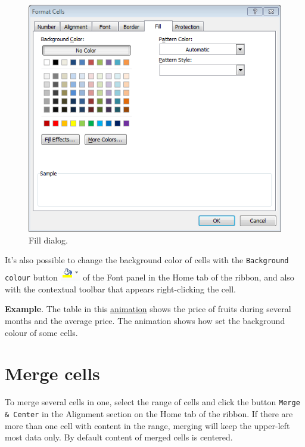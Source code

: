 \begin{figure}[htbp]
\begin{center}
\includegraphics[scale=0.7]{../img/fill_dialog.png}
\end{center}
\caption{Fill dialog.}
\label{img-fill_dialog}
\end{figure}

It's also possible to change the background color of cells with the \texttt{Background colour} button 
\includegraphics[scale=0.7]{../img/button_background_colour.png} of the Font panel in the Home tab of the ribbon, and
also with the contextual toolbar that appears right-clicking the cell.

\textbf{Example}. The table in this \href{http://aprendeconalf.es/office/excel/manual/img/example_background_colour.gif}{animation} shows the price of fruits during several months and the average price. The animation shows how set the background colour of some cells.

\section{Merge cells}\hypertarget{merge-cells}{}\label{merge-cells}

To merge several cells in one, select the range of cells and click the button \texttt{Merge \& Center} in the Alignment section on the Home tab of the ribbon. If there are more than one cell with content in the range, merging will keep the upper-left most data only. By default content of merged cells is centered.

